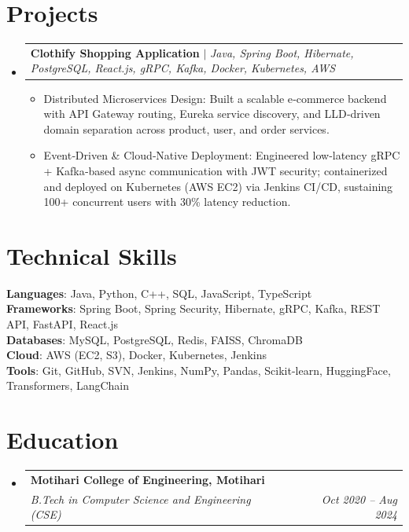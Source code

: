 \documentclass[10pt, letterpaper]{article}
\makeatletter
\newcommand{\resumeItem}[1]{
  \item\small{
    {#1 \vspace{-2pt}}
  }
}
\newcommand{\resumeSubheading}[4]{
  \vspace{-2pt}\item
    \begin{tabular*}{1.0\textwidth}[t]{l@{\extracolsep{\fill}}r}
      \textbf{#1} & \textbf{\small #2} \\
      \textit{\small#3} & \textit{\small #4} \\
    \end{tabular*}\vspace{-7pt}
}
\newcommand{\resumeProjectHeading}[2]{
    \item
    \begin{tabular*}{1.0\textwidth}{l@{\extracolsep{\fill}}r}
      \small#1 & \textbf{\small #2} \\
    \end{tabular*}\vspace{-7pt}
}
\newcommand{\resumeSubHeadingListStart}{\begin{itemize}[leftmargin=0.0in, label={}]}
\newcommand{\resumeSubHeadingListEnd}{\end{itemize}}
\newcommand{\resumeItemListStart}{\begin{itemize}[leftmargin=0.15in]}
\newcommand{\resumeItemListEnd}{\end{itemize}\vspace{-5pt}}
\makeatother
\begin{document}
\section{Projects}
\resumeSubHeadingListStart
  \resumeProjectHeading{\textbf{Clothify Shopping Application} $|$ \emph{Java, Spring Boot, Hibernate, PostgreSQL, React.js, gRPC, Kafka, Docker, Kubernetes, AWS}}{}
    \resumeItemListStart
      \resumeItem{Distributed Microservices Design: Built a scalable e‑commerce backend with API Gateway routing, Eureka service discovery, and LLD‑driven domain separation across product, user, and order services.}
      \resumeItem{Event‑Driven \& Cloud‑Native Deployment: Engineered low‑latency gRPC + Kafka‑based async communication with JWT security; containerized and deployed on Kubernetes (AWS EC2) via Jenkins CI/CD, sustaining 100+ concurrent users with 30\% latency reduction.}
    \resumeItemListEnd
\resumeSubHeadingListEnd


\section{Technical Skills}
\begin{itemize}[leftmargin=0.15in, label={}]
  \small{\item{
    \textbf{Languages}{: Java, Python, C++, SQL, JavaScript, TypeScript} \\
    \textbf{Frameworks}{: Spring Boot, Spring Security, Hibernate, gRPC, Kafka, REST API, FastAPI, React.js} \\
    \textbf{Databases}{: MySQL, PostgreSQL, Redis, FAISS, ChromaDB} \\
    \textbf{Cloud}{: AWS (EC2, S3), Docker, Kubernetes, Jenkins} \\
    \textbf{Tools}{: Git, GitHub, SVN, Jenkins, NumPy, Pandas, Scikit-learn, HuggingFace, Transformers, LangChain} \\
  }}
\end{itemize}


\section{Education}
\resumeSubHeadingListStart
  \resumeSubheading{Motihari College of Engineering, Motihari}{}{B.Tech in Computer Science and Engineering (CSE)}{Oct 2020 -- Aug 2024}
\resumeSubHeadingListEnd
\end{document}
